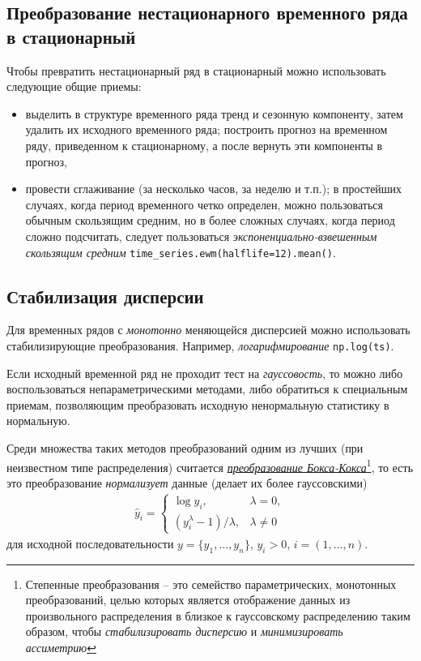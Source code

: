 \documentclass[%
	11pt,
	a4paper,
	utf8,
		]{article}
\begin{document}
\subsection{Преобразование нестационарного временного ряда в стационарный}

Чтобы превратить нестационарный ряд в стационарный можно использовать следующие общие приемы:
\begin{itemize}
	\item выделить в структуре временного ряда тренд и сезонную компоненту, затем удалить их исходного временного ряда; построить прогноз на временном ряду, приведенном к стационарному, а после вернуть эти компоненты в прогноз,
	
	\item провести сглаживание (за несколько часов, за неделю и т.п.); в простейших случаях, когда период временного четко определен, можно пользоваться обычным скользящим средним, но в более сложных случаях, когда период сложно подсчитать, следует пользоваться \emph{экспоненциально-взвешенным скользящим средним}
	\lstinline{time_series.ewm(halflife=12).mean()}.
\end{itemize}


\subsection{Стабилизация дисперсии}

Для временных рядов с \emph{монотонно} меняющейся дисперсией можно использовать стабилизирующие преобразования. Например, \emph{логарифмирование} \lstinline{np.log(ts)}.

Если исходный временной ряд не проходит тест на \emph{гауссовость}, то можно либо воспользоваться непараметрическими методами, либо обратиться к специальным приемам, позволяющим преобразовать исходную ненормальную статистику в нормальную.

Среди множества таких методов преобразований одним из лучших (при неизвестном типе распределения) считается \href{http://www.machinelearning.ru/wiki/index.php?title=Метод_Бокса-Кокса}{\itshape преобразование Бокса-Кокса}\footnote{Степенные преобразования -- это семейство параметрических, монотонных преобразований, целью которых является отображение данных из произвольного распределения в близкое к гауссовскому распределению таким образом, чтобы \emph{стабилизировать дисперсию} и \emph{минимизировать ассиметрию}}, то есть это преобразование \emph{нормализует} данные (делает их более гауссовскими)
\begin{align*}
	\hat{y}_i =
	\begin{cases}
		\log y_i, &\lambda = 0,\\
		(y_i^\lambda - 1)/\lambda, &\lambda \neq 0
	\end{cases}
\end{align*}
для исходной последовательности $ y = \{y_1, \dots, y_n\}, \,y_i > 0,\, i = (1, \dots, n) $.
\end{document}
